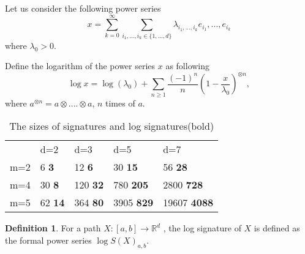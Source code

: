 \documentclass[12pt,a4paper]{report}
\theoremstyle{definition}
\newtheorem{definition}{Definition}
\begin{document}
Let us consider the following power series
\begin{equation}
	x=\sum_{k=0}^{\infty}\sum_{i_1, . . . , i_k \in \{1,...,d\}}\lambda_{i_1, . . . , i_k}e_{i_1}, . . . ,e_{i_k}
\end{equation}
where $\lambda_0>0$.

Define the logarithm of the power series $x$ as following
\begin{equation}
	\log x=\log(\lambda_0)+\sum_{n\geq 1}\dfrac{(-1)^n}{n}(1-\frac{x}{\lambda_0})^{\otimes n},
\end{equation}
where $a^{\otimes n}=a\otimes ....\otimes a$,  $n$ times of $a$.

\begin{table}[htb]
	\centering
	\begin{tabular}{l|l|l|l|l}
		& \textcolor[rgb]{0.2,0.2,0.2}{d=2} & \textcolor[rgb]{0.2,0.2,0.2}{d=3} & \textcolor[rgb]{0.2,0.2,0.2}{d=5} & \textcolor[rgb]{0.2,0.2,0.2}{d=7}  \\
		\textcolor[rgb]{0.2,0.2,0.2}{m=2} & 6 \textbf{3}                      & 12    \textbf{6}                  & 30  \textbf{15}  				        & 56    \textbf{28}                             \\
		\textcolor[rgb]{0.2,0.2,0.2}{m=4} & 30   \textbf{8}                             & 120       \textbf{32}                        & 780     \textbf{205}                          & 2800   \textbf{728}                            \\
		\textcolor[rgb]{0.2,0.2,0.2}{m=5} & 62   \textbf{14}                             & 364  \textbf{80}                             & 3905     \textbf{829}                         & 19607        \textbf{4088}                     
	\end{tabular}
	\caption{The sizes of signatures and log signatures(bold)}
	\label{LogSignatureSize}
\end{table}

\begin{definition}
 For a path $X :[a, b] \rightarrow \mathbb{R}^d$ , the log signature of $X$ is defined as the formal power series $\log S(X)_{a,b}$.
\end{definition}
\end{document}
